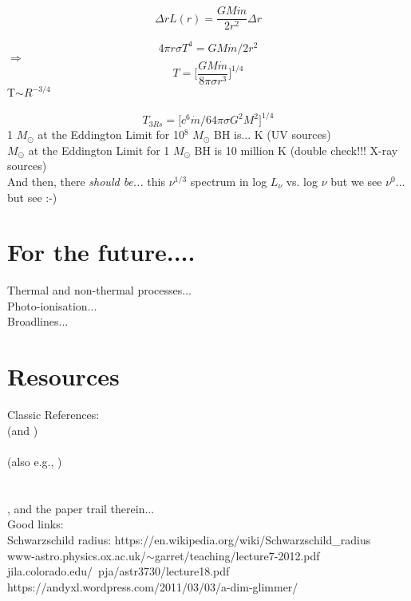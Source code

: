 \documentclass[11pt]{article}
\begin{document}
\begin{equation}
  \Delta r L(r) = \frac{GM\dot{m} }{2r^2} \Delta r
\end{equation}

\begin{equation}
4 \pi r \sigma T^{4} = GM\dot{m} / 2 r^2
\end{equation}
$\Rightarrow$
\begin{equation}
 T =  \lbrack \frac{GM\dot{m}}{8 \pi \sigma r^{3}} \rbrack^{1/4}
\end{equation}
T$\sim R^{-3/4}$

\begin{equation}
  T_{3 Rs} = \lbrack c^{6} \dot{m} / 64 \pi \sigma G^{2} M^{2} \rbrack^{1/4}
\end{equation}
1 $M_\odot$ at the Eddington Limit for 10$^{8}$ $M_\odot$ BH is... K
(UV sources)\\

 $M_\odot$ at the Eddington Limit for 1 $M_\odot$ BH is 10 million K
(double check!!! X-ray sources)\\

\noindent
And then, there {\it should be...} this $\nu^{1/3}$ spectrum in log
$L_{\nu}$ vs. log $\nu$
but we see $\nu^{0}$... 
but see \citet[e.g.][]{Kishimoto08} :-) \\



\clearpage
\section{For the future....}
Thermal and non-thermal processes...\\
Photo-ionisation...\\
Broadlines...\\



\clearpage
\section{Resources}
Classic References:\\
\citet{SS73} (and \citet{King09}) \\
\citet{Pringle81}\\
(also e.g., \citet{Pringle72, Pringle73, Pringle96})\\
\citet{Richards06b}\\
\citet{Kishimoto08}\\
\citet{Lawrence12}, and the paper trail therein...\\

\noindent
Good links:\\
Schwarzschild radius: https://en.wikipedia.org/wiki/Schwarzschild\_radius\\
www-astro.physics.ox.ac.uk/$\sim$garret/teaching/lecture7-2012.pdf\\
jila.colorado.edu/~pja/astr3730/lecture18.pdf\\
https://andyxl.wordpress.com/2011/03/03/a-dim-glimmer/\\





\end{document}
